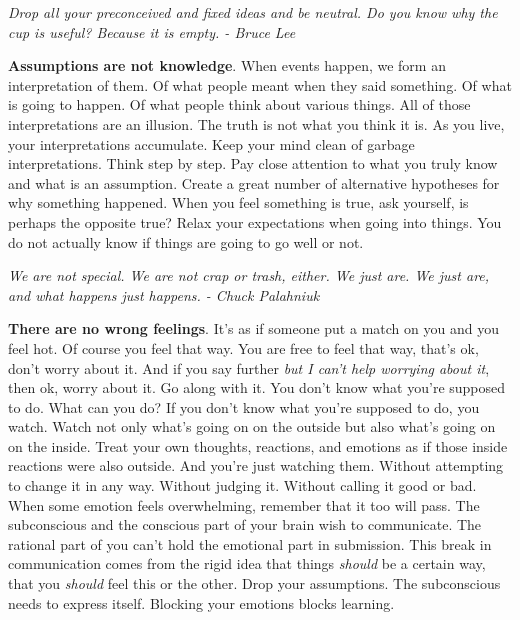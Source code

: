 \documentclass[a4paper,hidelinks]{article}
\begin{document}
\newpage

\begin{center}
\textit{
Drop all your preconceived and fixed ideas and be neutral. Do you know why the cup is useful? Because it is empty. - Bruce Lee
}
\end{center}

\textbf{Assumptions are not knowledge}.
When events happen, we form an interpretation of them.
Of what people meant when they said something.
Of what is going to happen.
Of what people think about various things.
All of those interpretations are an illusion.
The truth is not what you think it is.
As you live, your interpretations accumulate.
Keep your mind clean of garbage interpretations.
Think step by step.
Pay close attention to what you truly know and what is an assumption.
Create a great number of alternative hypotheses for why something happened.
When you feel something is true, ask yourself, is perhaps the opposite true?
Relax your expectations when going into things.
You do not actually know if things are going to go well or not.

\newpage

\begin{center}
\textit{
We are not special. We are not crap or trash, either. We just are. We just are, and what happens just happens. - Chuck Palahniuk
}
\end{center}

\textbf{There are no wrong feelings}.
It's as if someone put a match on you and you feel hot.
Of course you feel that way.
You are free to feel that way, that's ok, don't worry about it.
And if you say further \textit{but I can't help worrying about it}, then ok, worry about it.
Go along with it.
You don't know what you're supposed to do.
What can you do?
If you don't know what you're supposed to do, you watch.
Watch not only what's going on on the outside but also what's going on on the inside.
Treat your own thoughts, reactions, and emotions as if those inside reactions were also outside.
And you're just watching them.
Without attempting to change it in any way.
Without judging it.
Without calling it good or bad.
When some emotion feels overwhelming, remember that it too will pass.
The subconscious and the conscious part of your brain wish to communicate.
The rational part of you can't hold the emotional part in submission.
This break in communication comes from the rigid idea that things \textit{should} be a certain way, that you \textit{should} feel this or the other.
Drop your assumptions.
The subconscious needs to express itself.
Blocking your emotions blocks learning.
\end{document}
